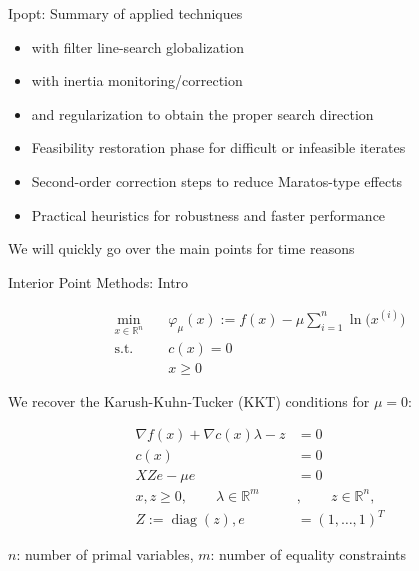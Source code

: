 \documentclass{beamer}
\begin{document}
\begin{frame}{Ipopt: Summary of applied techniques}

  \begin{itemize}
    \item {} with filter line-search globalization
    \item {} with inertia monitoring/correction
    \item {} and regularization to obtain the proper search direction
    \item Feasibility restoration phase for difficult or infeasible iterates
    \item Second-order correction steps to reduce Maratos-type effects
    \item Practical heuristics for robustness and faster performance
  \end{itemize}

  We will quickly go over the main points for time reasons

\end{frame}

\begin{frame}{Interior Point Methods: Intro}
  \vspace{-2.0em}

  \begin{align}
    \min_{x \in \mathbb{R}^n}\quad & \varphi_\mu(x) := f(x) - \mu \sum_{i=1}^n \ln\!\bigl(x^{(i)}\bigr) \\
    \text{s.t.}\quad               & c(x) = 0                                                           \\
    \quad                          & x \ge 0
  \end{align}

  \pause

  We recover the Karush-Kuhn-Tucker (KKT) conditions for $\mu = 0$:

  \vspace{-1.0em}

  \begin{align}
    \nabla f(x) + \nabla c(x)\lambda - z       & = 0                                    \\
    c(x)                                       & = 0                                    \\
    XZ e - \mu e                               & = 0                                    \\
    x, z \ge 0,\qquad \lambda \in \mathbb{R}^m & , \qquad z \in \mathbb{R}^n, \nonumber \\
    Z := \operatorname{diag}(z), e             & = (1,\dots,1)^T \nonumber
  \end{align}

  $n$: number of primal variables, $m$: number of equality constraints

\end{frame}
\end{document}
